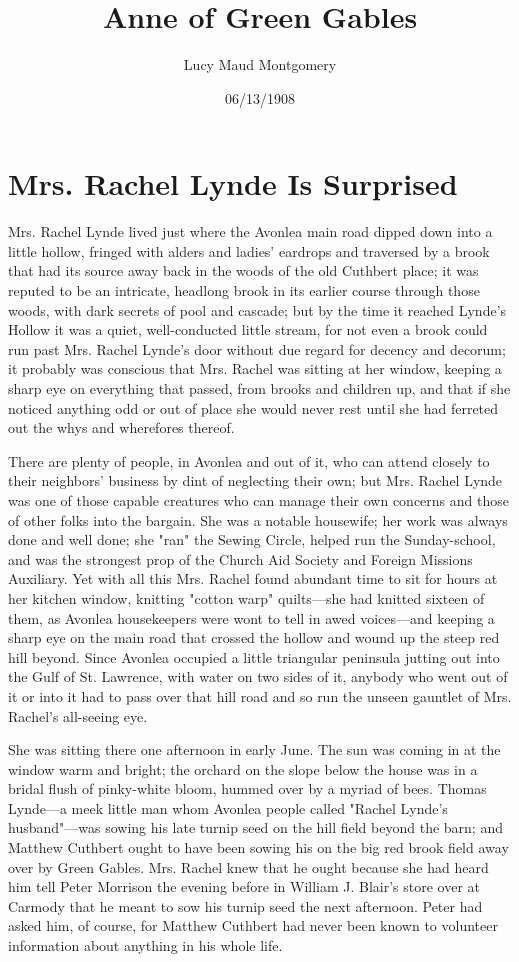 \documentclass{article}
\title{Anne of Green Gables}
\author{Lucy Maud Montgomery}
\date{06/13/1908}
\begin{document}
\maketitle

\section{Mrs. Rachel Lynde Is Surprised}
Mrs. Rachel Lynde lived just where the Avonlea main road dipped down into a little hollow, fringed with alders and ladies' eardrops and traversed by a brook that had its source away back in the woods of the old Cuthbert place; it was reputed to be an intricate, headlong brook in its earlier course through those woods, with dark secrets of pool and cascade; but by the time it reached Lynde's Hollow it was a quiet, well-conducted little stream, for not even a brook could run past Mrs. Rachel Lynde's door without due regard for decency and decorum; it probably was conscious that Mrs. Rachel was sitting at her window, keeping a sharp eye on everything that passed, from brooks and children up, and that if she noticed anything odd or out of place she would never rest until she had ferreted out the whys and wherefores thereof.

There are plenty of people, in Avonlea and out of it, who can attend closely to their neighbors' business by dint of neglecting their own; but Mrs. Rachel Lynde was one of those capable creatures who can manage their own concerns and those of other folks into the bargain. She was a notable housewife; her work was always done and well done; she "ran" the Sewing Circle, helped run the Sunday-school, and was the strongest prop of the Church Aid Society and Foreign Missions Auxiliary. Yet with all this Mrs. Rachel found abundant time to sit for hours at her kitchen window, knitting "cotton warp" quilts---she had knitted sixteen of them, as Avonlea housekeepers were wont to tell in awed voices---and keeping a sharp eye on the main road that crossed the hollow and wound up the steep red hill beyond. Since Avonlea occupied a little triangular peninsula jutting out into the Gulf of St. Lawrence, with water on two sides of it, anybody who went out of it or into it had to pass over that hill road and so run the unseen gauntlet of Mrs. Rachel's all-seeing eye.

She was sitting there one afternoon in early June. The sun was coming in at the window warm and bright; the orchard on the slope below the house was in a bridal flush of pinky-white bloom, hummed over by a myriad of bees. Thomas Lynde---a meek little man whom Avonlea people called "Rachel Lynde's husband"---was sowing his late turnip seed on the hill field beyond the barn; and Matthew Cuthbert ought to have been sowing his on the big red brook field away over by Green Gables. Mrs. Rachel knew that he ought because she had heard him tell Peter Morrison the evening before in William J. Blair's store over at Carmody that he meant to sow his turnip seed the next afternoon. Peter had asked him, of course, for Matthew Cuthbert had never been known to volunteer information about anything in his whole life.
\end{document}

